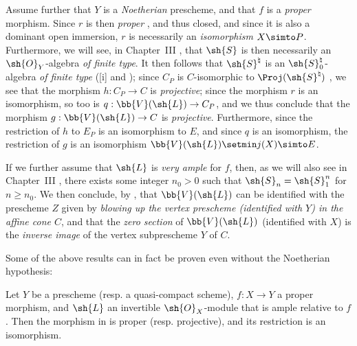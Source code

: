 \begin{remark}[8.8.3]
\label{II.8.8.3}
Assume further that $Y$ is a \emph{Noetherian} prescheme, and that $f$ is a \emph{proper} morphism.
Since $r$ is then \emph{proper} , and thus closed, and since it is also a dominant open immersion, $r$ is necessarily an \emph{isomorphism} $X\simto P$.
Furthermore, we will see, in Chapter~III , that $\sh{S}$ is then necessarily an $\sh{O}_Y$-algebra \emph{of finite type}.
It then follows that $\sh{S}^\natural$ is an $\sh{S}_0^\natural$-algebra \emph{of finite type} ([i] and );
since $C_P$ is $C$-isomorphic to $\Proj(\sh{S}^\natural)$ , we see that the morphism $h:C_P\to C$ is \emph{projective};
since the morphism $r$ is an isomorphism, so too is $q:\bb{V}(\sh{L})\to C_P$, and we thus conclude that the morphism $g:\bb{V}(\sh{L})\to C$ is \emph{projective}.
Furthermore, since the restriction of $h$ to $E_P$ is an isomorphism to $E$, and since $q$ is an isomorphism, the restriction  of $g$ is an isomorphism $\bb{V}(\sh{L})\setmin j(X)\simto E$.

If we further assume that $\sh{L}$ is \emph{very ample} for $f$, then, as we will also see in Chapter~III , there exists some integer $n_0>0$ such that $\sh{S}_n=\sh{S}_1^n$ for $n\geq n_0$.
We then conclude, by , that $\bb{V}(\sh{L})$ can be identified with the prescheme $Z$ given by \emph{blowing up the vertex prescheme \emph{(identified with $Y$)} in the affine cone $C$}, and that the \emph{zero section} of $\bb{V}(\sh{L})$ (identified with $X$) is the \emph{inverse image} of the vertex subprescheme $Y$ of $C$.

Some of the above results can in fact be proven even without the Noetherian hypothesis:
\end{remark}
\begin{corollary}[8.8.4]
\label{II.8.8.4}
Let $Y$ be a prescheme (resp. a quasi-compact scheme), $f:X\to Y$ a proper morphism, and $\sh{L}$ an invertible $\sh{O}_X$-module that is ample relative to $f$.
Then the morphism in  is proper (resp. projective), and its restriction  is an isomorphism.
\end{corollary}

